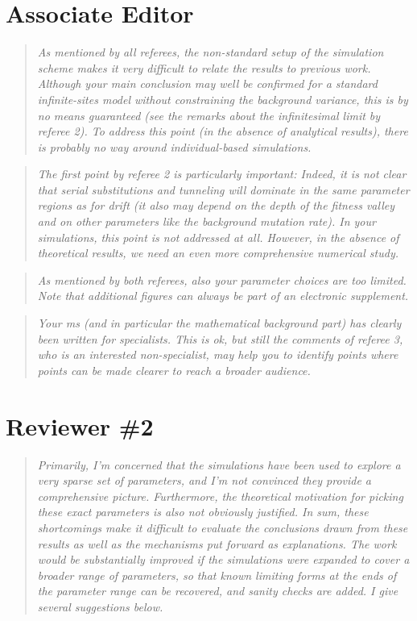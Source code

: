 \documentclass[11pt]{article}
\newenvironment{reviewerquote}{\begin{quote}\color{black}\itshape}{\end{quote}}
\begin{document}
\section*{Associate Editor}

\begin{reviewerquote}
As mentioned by all referees, the non-standard setup of the simulation scheme makes it very difficult to relate the results to previous work. Although your main conclusion may well be confirmed for a standard infinite-sites model without constraining the background variance, this is by no means guaranteed (see the remarks about the infinitesimal limit by referee 2). To address this point (in the absence of analytical results), there is probably no way around individual-based simulations.
\end{reviewerquote}

\begin{reviewerquote}
The first point by referee 2 is particularly important: Indeed, it is not clear that serial substitutions and tunneling will dominate in the same parameter regions as for drift (it also may depend on the depth of the fitness valley and on other parameters like the background mutation rate). In your simulations, this point is not addressed at all. However, in the absence of theoretical results, we need an even more comprehensive numerical study.
\end{reviewerquote}

\begin{reviewerquote}
As mentioned by both referees, also your parameter choices are too limited. Note that additional figures can always be part of an electronic supplement.
\end{reviewerquote}

\begin{reviewerquote}
Your ms (and in particular the mathematical background part) has clearly been written for specialists. This is ok, but still the comments of referee 3, who is an interested non-specialist, may help you to identify points where points can be made clearer to reach a broader audience.
\end{reviewerquote}


\section*{Reviewer \#2}

\begin{reviewerquote}
Primarily, I’m concerned that the simulations have been used to explore a very sparse set of parameters, and I’m not convinced they provide a comprehensive picture. Furthermore, the theoretical motivation for picking these exact parameters is also not obviously justified. In sum, these shortcomings make it difficult to evaluate the conclusions drawn from these results as well as the mechanisms put forward as explanations. The work would be substantially improved if the simulations were expanded to cover a broader range of parameters, so that known limiting forms at the ends of the parameter range can be recovered, and sanity checks are added. I give several suggestions below.
\end{reviewerquote}
\end{document}

